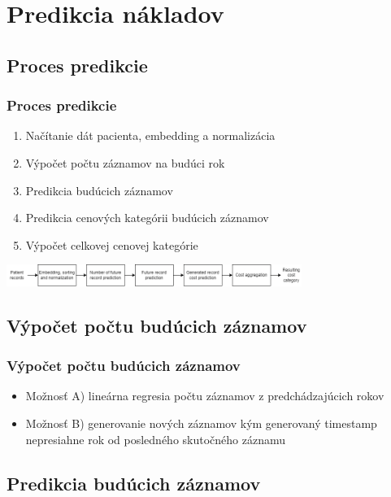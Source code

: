 \documentclass[slovak]{beamer}
\begin{document}
\section{Predikcia nákladov}

\subsection{Proces predikcie}

\begin{frame}
	\frametitle{Proces predikcie}
	\begin{enumerate}
		\item<1> Načítanie dát pacienta, embedding a normalizácia
		\item<1> Výpočet počtu záznamov na budúci rok
		\item<1> Predikcia budúcich záznamov
		\item<1> Predikcia cenových kategórii budúcich záznamov
		\item<1> Výpočet celkovej cenovej kategórie
	\end{enumerate}
	\includegraphics[height=0.7cm]{images/model_workflow.png}
\end{frame}

\subsection{Výpočet počtu budúcich záznamov}

\begin{frame}
	\frametitle{Výpočet počtu budúcich záznamov}
	\begin{itemize}
		\item<1> Možnosť A) lineárna regresia počtu záznamov z predchádzajúcich rokov
		\item<1> Možnosť B) generovanie nových záznamov kým generovaný timestamp nepresiahne rok od posledného skutočného záznamu
	\end{itemize}
\end{frame}

\subsection{Predikcia budúcich záznamov}
\end{document}
